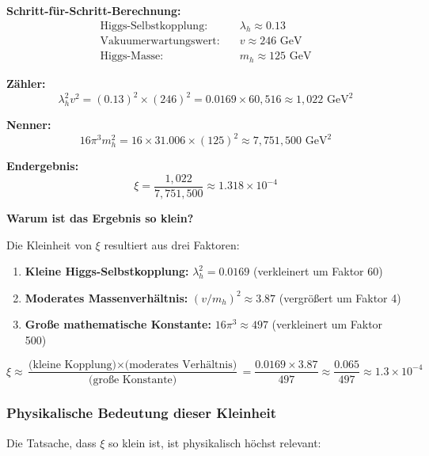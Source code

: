 \documentclass[12pt,a4paper]{article}
\theoremstyle{definition}
\begin{document}
\textbf{Schritt-für-Schritt-Berechnung:}
\begin{align}
	\text{Higgs-Selbstkopplung:} \quad &\lambda_h \approx 0.13 \\
	\text{Vakuumerwartungswert:} \quad &v \approx 246 \text{ GeV} \\
	\text{Higgs-Masse:} \quad &m_h \approx 125 \text{ GeV}
\end{align}

\textbf{Zähler:} 
\begin{equation}
	\lambda_h^2 v^2 = (0.13)^2 \times (246)^2 = 0.0169 \times 60,516 \approx 1,022 \text{ GeV}^2
\end{equation}

\textbf{Nenner:}
\begin{equation}
	16\pi^3 m_h^2 = 16 \times 31.006 \times (125)^2 \approx 7,751,500 \text{ GeV}^2
\end{equation}

\textbf{Endergebnis:}
\begin{equation}
	\xi = \frac{1,022}{7,751,500} \approx 1.318 \times 10^{-4}
\end{equation}

\textbf{Warum ist das Ergebnis so klein?}

Die Kleinheit von $\xi$ resultiert aus drei Faktoren:
\begin{enumerate}
	\item \textbf{Kleine Higgs-Selbstkopplung:} $\lambda_h^2 = 0.0169$ (verkleinert um Faktor 60)
	\item \textbf{Moderates Massenverhältnis:} $(v/m_h)^2 \approx 3.87$ (vergrößert um Faktor 4)
	\item \textbf{Große mathematische Konstante:} $16\pi^3 \approx 497$ (verkleinert um Faktor 500)
\end{enumerate}

\begin{equation}
	\xi \approx \frac{\text{(kleine Kopplung)} \times \text{(moderates Verhältnis)}}{\text{(große Konstante)}} = \frac{0.0169 \times 3.87}{497} \approx \frac{0.065}{497} \approx 1.3 \times 10^{-4}
\end{equation}

\subsubsection{Physikalische Bedeutung dieser Kleinheit}
\label{subsubsec:physical_meaning_smallness}

Die Tatsache, dass $\xi$ so klein ist, ist physikalisch höchst relevant:
\end{document}
